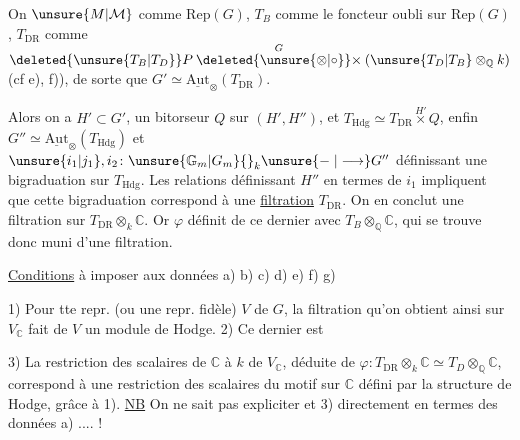  On  $\unsure{M|\mathcal M}$ comme $\mathrm{Rep}(G)$, $T_B$  comme le foncteur oubli sur $\mathrm{Rep}(G)$, $T_{\mathrm{DR}}$ comme $\deleted{\unsure{T_B|T_D}}P\overset{G}{\deleted{\unsure{\otimes|\circ}}\times}(\unsure{T_D|T_B}\otimes_{\mathbb Q}k)$ (cf e), f)),  de sorte que $G'\simeq\underline{\mathrm{Aut}}_{\otimes}(T_{\mathrm{DR}})$.


Alors on a $H'\subset G'$, un bitorseur $Q$ sur $(H',H'')$,  et $T_{\mathrm{Hdg}}\simeq T_{\mathrm{DR}}\overset{H'}{\times}Q$, enfin  $G''\simeq\underline{\mathrm{Aut}}_{\otimes}(T_{\mathrm{Hdg}})$ et $\unsure{i_1|j_1},i_2\colon \unsure{\mathbb G_m|G_m}{}_{k}\unsure{\mathrel{-}|\longrightarrow}G''$ définissant une bigraduation sur $T_{\mathrm{Hdg}}$. Les relations  définissant $H''$ en termes de $i_1$ impliquent que cette bigraduation correspond à une  \uline{filtration}  $T_{\mathrm{DR}}$. On en conclut une filtration sur $T_{\mathrm{DR}}\otimes_k\mathbb C$. Or $\varphi$ définit   de ce dernier avec $T_B\otimes_{\mathbb Q}\mathbb C$, qui se trouve donc muni d'une filtration.

\uline{Conditions} à imposer aux données a) b) c) d) e) f) g)

 1) Pour tte repr. (ou une repr. fidèle) $V$ de $G$, la filtration qu'on obtient ainsi sur $V_{\mathbb C}$  fait de $V$ un module de Hodge. 2) Ce dernier est 

3) La restriction des scalaires de $\mathbb C$ à $k$ de $V_{\mathbb C}$, déduite de $\varphi\colon T_{\mathrm{DR}}\otimes_k\mathbb C\simeq T_D\otimes_{\mathbb Q}\mathbb C$, correspond à une restriction des scalaires du motif sur $\mathbb C$ défini par la structure de Hodge, grâce à 1). \uline{NB} On ne sait pas expliciter  et 3)  directement en termes des données a) .... !

